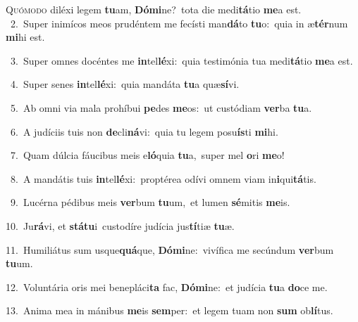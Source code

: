 \lettrine{\initial\textcolor{\initialcolor}{Q}}{uómodo} diléxi legem \textbf{tu}\-am, \textbf{Dó}\-\textbf{mi}ne?~\star tota die medi\-\textbf{tá}\-tio \textbf{me}\-a est.\\
{\numbfont\textcolor{\numbcolor}{~2.}}~Super inimícos meos prudéntem me fecísti man\-\textbf{dá}\-to \textbf{tu}\-o:~\star quia in æ\-\textbf{tér}\-num \textbf{mi}\-hi est.\par
{\numbfont\textcolor{\numbcolor}{~3.}}~Super omnes docéntes me \textbf{in}\-tel\-\textbf{lé}\-xi:~\star quia testimónia tua medi\-\textbf{tá}\-tio \textbf{me}\-a est.\par
{\numbfont\textcolor{\numbcolor}{~4.}}~Super senes \textbf{in}\-tel\-\textbf{lé}\-xi:~\star quia mandáta \textbf{tu}\-a quæ\-\textbf{sí}\-vi.\par
{\numbfont\textcolor{\numbcolor}{~5.}}~Ab omni via mala prohíbui \textbf{pe}\-des \textbf{me}\-os:~\star ut custódiam \textbf{ver}\-ba \textbf{tu}\-a.\par
{\numbfont\textcolor{\numbcolor}{~6.}}~A judíciis tuis non \textbf{de}\-cli\-\textbf{ná}\-vi:~\star quia tu legem posu\-\textbf{ís}\-ti \textbf{mi}\-hi.\par
{\numbfont\textcolor{\numbcolor}{~7.}}~Quam dúlcia fáucibus meis e\-\textbf{ló}\-quia \textbf{tu}\-a,~\star super mel \textbf{o}\-ri \textbf{me}\-o!\par
{\numbfont\textcolor{\numbcolor}{~8.}}~A mandátis tuis \textbf{in}\-tel\-\textbf{lé}\-xi:~\star proptérea odívi omnem viam in\-\textbf{i}\-qui\-\textbf{tá}\-tis.\par
{\numbfont\textcolor{\numbcolor}{~9.}}~Lucérna pédibus meis \textbf{ver}\-bum \textbf{tu}\-um,~\star et lumen \textbf{sé}\-mitis \textbf{me}\-is.\par
{\numbfont\textcolor{\numbcolor}{10.}}~Ju\-\textbf{rá}\-vi, et \textbf{stá}\-\textbf{tu}i~\star custodíre judícia jus\-\textbf{tí}\-tiæ \textbf{tu}\-æ.\par
{\numbfont\textcolor{\numbcolor}{11.}}~Humiliátus sum usque\-\textbf{quá}\-que, \textbf{Dó}\-\textbf{mi}ne:~\star vivífica me secúndum \textbf{ver}\-bum \textbf{tu}\-um.\par
{\numbfont\textcolor{\numbcolor}{12.}}~Voluntária oris mei benepláci\textbf{ta} fac, \textbf{Dó}\-\textbf{mi}ne:~\star et judícia \textbf{tu}\-a \textbf{do}\-ce me.\par
{\numbfont\textcolor{\numbcolor}{13.}}~Anima mea in mánibus \textbf{me}\-is \textbf{sem}\-per:~\star et legem tuam non \textbf{sum} ob\-\textbf{lí}\-tus.\par
